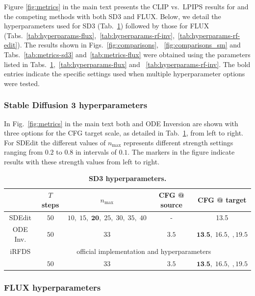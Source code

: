 Figure \ref{fig:metrics} in the main text presents the CLIP vs.~LPIPS results for \ours{} and the competing methods with both SD3 and FLUX. Below, we detail the hyperparameters used for SD3 (Tab.~\ref{tab:hyperparams-sd3}) followed by those for FLUX (Tabs.~\ref{tab:hyperparams-flux},~\ref{tab:hyperparams-rf-inv},~\ref{tab:hyperparams-rf-edit}). 
The results shown in Figs.~\ref{fig:comparisons}, ~\ref{fig:comparisons_sm} and Tabs.~\ref{tab:metrics-sd3} and~\ref{tab:metrics-flux} were obtained using the parameters listed in Tabs.~\ref{tab:hyperparams-sd3},~\ref{tab:hyperparams-flux} and ~\ref{tab:hyperparams-rf-inv}. The bold entries indicate the specific settings used when multiple hyperparameter options were tested.

\subsubsection{Stable Diffusion 3 hyperparameters}

In Fig.~\ref{fig:metrics} in the main text both \ours{} and ODE Inversion are shown with three options for the CFG target scale, as detailed in Tab.~\ref{tab:hyperparams-sd3}, from left to right. For SDEdit the different values of $n_{\text{max}}$ represents different strength settings ranging from $0.2$ to $0.8$ in intervals of $0.1$. The markers in the figure indicate results with these strength values from left to right. 

\begin{table}[h]
\centering
\caption{\textbf{SD3 hyperparameters.}}
\label{tab:hyperparams-sd3}
\begin{tabular}{@{}ccccc@{}}
\toprule
 & $T$ steps & $n_{\text{max}} $ & CFG @ source & CFG @ target \\ \midrule
SDEdit & $50$ &  $10,\;15,\;\textbf{20},\;25,\;30,\;35,\;40$ & -  & 13.5  \\
ODE Inv. & $50$ & $33$ & $3.5$ & $\textbf{13.5},\;16.5,\;,19.5$     \\
iRFDS & \multicolumn{4}{c}{official implementation and hyperparameters} \\
\midrule
\ours{} & $50$ & $33$ & $3.5$ & $\textbf{13.5},\;16.5,\;,19.5$     \\
\bottomrule
\end{tabular}
\end{table}

\subsubsection{FLUX hyperparameters}

